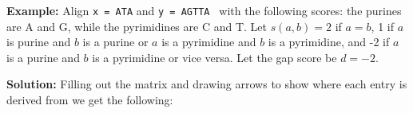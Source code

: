 \documentclass[11pt]{article}
\begin{document}
%

{\bf Example:} Align {\tt x = ATA} and {\tt y = AGTTA } with the following scores: the purines  are A and G, while the pyrimidines are  C and T.  Let $s(a,b) = 2$ if $a = b$, 1 if $a$ is purine and $b$ is a purine or $a$ is a pyrimidine and  $b$ is a pyrimidine, and -2 if $a$ is a purine and $b$ is a pyrimidine or vice versa.  Let the gap score be $d = -2$.

{\bf Solution:}
Filling out the matrix and drawing arrows to show where each entry is derived from we get the following:
\end{document}
